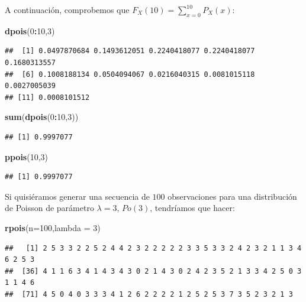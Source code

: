 \documentclass[]{book}
\newenvironment{Shaded}{\begin{snugshade}}{\end{snugshade}}
\newcommand{\DataTypeTok}[1]{\textcolor[rgb]{0.13,0.29,0.53}{#1}}
\newcommand{\DecValTok}[1]{\textcolor[rgb]{0.00,0.00,0.81}{#1}}
\newcommand{\KeywordTok}[1]{\textcolor[rgb]{0.13,0.29,0.53}{\textbf{#1}}}
\newcommand{\NormalTok}[1]{#1}
\newcommand{\OperatorTok}[1]{\textcolor[rgb]{0.81,0.36,0.00}{\textbf{#1}}}
\begin{document}
A continuación, comprobemos que \(F_X(10)=\sum\limits_{x=0}^{10} P_X(x)\):

\begin{Shaded}
\begin{Highlighting}[]
\KeywordTok{dpois}\NormalTok{(}\DecValTok{0}\OperatorTok{:}\DecValTok{10}\NormalTok{,}\DecValTok{3}\NormalTok{)}
\end{Highlighting}
\end{Shaded}

\begin{verbatim}
##  [1] 0.0497870684 0.1493612051 0.2240418077 0.2240418077 0.1680313557
##  [6] 0.1008188134 0.0504094067 0.0216040315 0.0081015118 0.0027005039
## [11] 0.0008101512
\end{verbatim}

\begin{Shaded}
\begin{Highlighting}[]
\KeywordTok{sum}\NormalTok{(}\KeywordTok{dpois}\NormalTok{(}\DecValTok{0}\OperatorTok{:}\DecValTok{10}\NormalTok{,}\DecValTok{3}\NormalTok{))}
\end{Highlighting}
\end{Shaded}

\begin{verbatim}
## [1] 0.9997077
\end{verbatim}

\begin{Shaded}
\begin{Highlighting}[]
\KeywordTok{ppois}\NormalTok{(}\DecValTok{10}\NormalTok{,}\DecValTok{3}\NormalTok{)}
\end{Highlighting}
\end{Shaded}

\begin{verbatim}
## [1] 0.9997077
\end{verbatim}

Si quisiéramos generar una secuencia de \(100\) observaciones para una distribución de Poisson de parámetro \(\lambda=3\), \(Po(3)\), tendríamos que hacer:

\begin{Shaded}
\begin{Highlighting}[]
\KeywordTok{rpois}\NormalTok{(}\DataTypeTok{n=}\DecValTok{100}\NormalTok{,}\DataTypeTok{lambda =} \DecValTok{3}\NormalTok{)}
\end{Highlighting}
\end{Shaded}

\begin{verbatim}
##   [1] 2 5 3 3 2 2 5 2 4 4 2 3 2 2 2 2 2 3 3 5 3 3 2 4 2 3 2 1 1 3 4 6 2 5 3
##  [36] 4 1 1 6 3 4 1 4 3 4 3 0 2 1 4 3 0 2 4 2 3 5 2 1 3 3 4 2 5 0 3 1 1 4 6
##  [71] 4 5 0 4 0 3 3 3 4 1 2 6 2 2 2 2 1 2 5 2 5 3 7 3 5 2 3 2 1 3
\end{verbatim}
\end{document}
